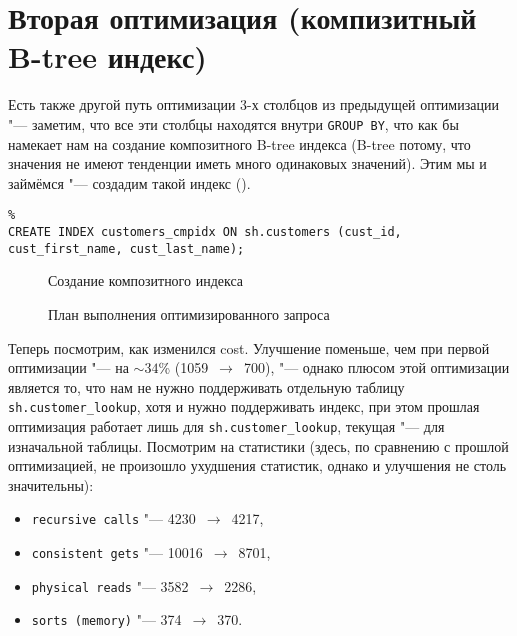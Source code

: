 \section{Вторая оптимизация (компизитный B-tree индекс)}


Есть также другой путь оптимизации 3-х столбцов из предыдущей оптимизации "--- заметим, что все эти столбцы находятся внутри \texttt{GROUP BY}, что как бы намекает нам на создание композитного B-tree индекса (B-tree потому, что значения не имеют тенденции иметь много одинаковых значений). Этим мы и займёмся "--- создадим такой индекс ().

\begin{verbatim}%
CREATE INDEX customers_cmpidx ON sh.customers (cust_id, cust_first_name, cust_last_name);
\end{verbatim}
\begin{figure}[H]%
  \caption{Создание композитного индекса}
  \label{baqua}
\end{figure}

\begin{figure}[H]%
  \caption{План выполнения оптимизированного запроса}
  \label{fig-task-4-composite-plan}
\end{figure}

Теперь посмотрим, как изменился cost. Улучшение поменьше, чем при первой оптимизации "--- на $\sim 34$\% (1059~$\to$~700), "--- однако плюсом этой оптимизации является то, что нам не нужно поддерживать отдельную таблицу \texttt{sh.customer\_lookup}, хотя и нужно поддерживать индекс, при этом прошлая оптимизация работает лишь для \texttt{sh.customer\_lookup}, текущая "--- для изначальной таблицы.
Посмотрим на статистики (здесь, по сравнению с прошлой оптимизацией, не произошло ухудшения статистик, однако и улучшения не столь значительны):
\begin{itemize}%
  \item \texttt{recursive calls} "--- 4230~$\to$~4217,
  \item \texttt{consistent gets} "--- 10016~$\to$~8701,
  \item \texttt{physical reads} "--- 3582~$\to$~2286,
  \item \texttt{sorts (memory)} "--- 374~$\to$~370.
\end{itemize}

